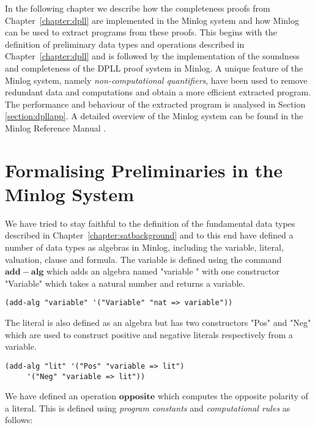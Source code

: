 
\label{chapter:dpllminlog}
In the following chapter we describe how the completeness proofs from Chapter~\ref{chapter:dpll} are implemented in the Minlog system and how Minlog can be used to extract programs from these proofs.  This begins with the definition of preliminary data types and operations described in Chapter~\ref{chapter:dpll} and is followed by the implementation of the soundness and completeness of the DPLL proof system in Minlog. A unique feature of the Minlog system, namely \emph{non-computational quantifiers}, have been used to remove redundant data and computations and obtain a more efficient extracted program. The performance and behaviour of the extracted program is analysed in Section \ref{section:dpllapp}. A detailed overview of the Minlog system can be found in the Minlog Reference Manual \cite{MinlogRef}.

\section{Formalising Preliminaries in the Minlog System}\label{sect:minlogprelim}
We have tried to stay faithful to the definition of the fundamental data types described in Chapter~\ref{chapter:satbackground} and to this end have defined a number of data types as algebras in Minlog, including the variable, literal, valuation, clause and formula. The variable is defined using the command $\mathbf{add-alg}$ which adds an algebra named "variable " with one constructor "Variable" which takes a natural number and returns a variable.
\begin{lstlisting}[caption = "Definition of a variable in Minlog"]
(add-alg "variable" '("Variable" "nat => variable"))
\end{lstlisting}
The literal is also defined as an algebra but has two constructors "Pos" and "Neg" which are used to construct positive and negative literals respectively from a variable.
\begin{lstlisting}[caption = "Definition of a literal in Minlog"]
(add-alg "lit" '("Pos" "variable => lit")
     '("Neg" "variable => lit"))
\end{lstlisting}

We have defined an operation $\mathbf{opposite}$ which computes the opposite polarity of a literal. This is defined using \emph{program constants} and \emph{computational rules} as follows:

